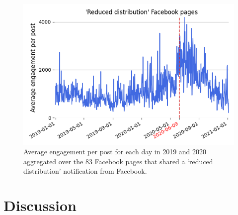 \documentclass[11pt,a4paper]{article}
\begin{document}
\begin{figure}[!h]
\centering
\includegraphics[width=\linewidth]{./../figure/reduce_average_timeseries.png}
\caption{Average engagement per post for each day in 2019 and 2020 aggregated over the 83 Facebook pages that shared a `reduced distribution' notification from Facebook.}
\label{reduce_average_timeseries}
\end{figure}


\section{Discussion}
\end{document}
